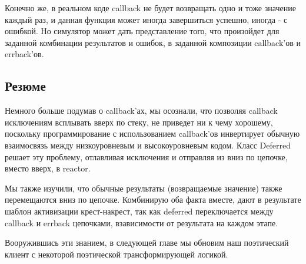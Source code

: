 Конечно же, в реальном коде callback не будет 
возвращать одно и тоже значение каждый раз, и 
данная функция может иногда завершиться успешно, 
иногда - с ошибкой. Но симулятор может дать 
представление того, что произойдет для 
заданной комбинации результатов и ошибок, в заданной 
композиции callback'ов и errback'ов.


\subsection{Резюме}

Немного больше подумав о callback'ах, мы осознали, что 
позволяя callback исключениям всплывать вверх по стеку, 
не приведет ни к чему хорошему, поскольку программирование 
с использованием callback'ов инвертирует обычную взаимосвязь 
между низкоуровневым и высокоуровневым кодом. Класс Deferred 
решает эту проблему, отлавливая исключения и отправляя из вниз по 
цепочке, вместо вверх, в reactor.
 

Мы также изучили, что обычные результаты (возвращаемые значение) 
также перемещаются вниз по цепочке. Комбинирую оба факта вместе, дают 
в результате шаблон активизации крест-накрест, так как deferred 
переключается между callback и errback цепочками, взависимости от 
результата на каждом этапе.


Вооружившись эти знанием, в следующей главе мы 
обновим наш поэтический клиент с некоторой поэтической 
трансформирующей логикой.



